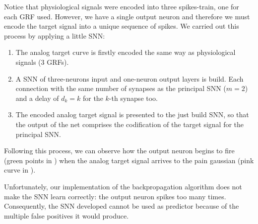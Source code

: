 Notice that physiological signals were encoded into three spikes-train, one for each GRF used. However, we have a single output neuron and therefore we must encode the target signal into a unique sequence of spikes. We carried out this process by applying a little SNN: 
\begin{enumerate}
\item The analog target curve is firstly encoded the same way as physiological signals (3 GRFs).
\item A SNN of three-neurons input and one-neuron output layers is build. Each connection with the same number of synapses as the principal SNN ($m=2$) and a delay of $d_{k}=k$ for the $k$-th synapse too.
\item The encoded analog target signal is presented to the just build SNN, so that the output of the net comprises the codification of the target signal for the principal SNN.
\end{enumerate}

Following this process, we can observe how the output neuron begins to fire (green points in ) when the analog target signal arrives to the pain gaussian (pink curve in ).

Unfortunately, our implementation of the backpropagation algorithm does not make the SNN learn correctly: the output neuron spikes too many times. Consequently, the SNN developed cannot be used as predictor because of the multiple false positives it would produce.
